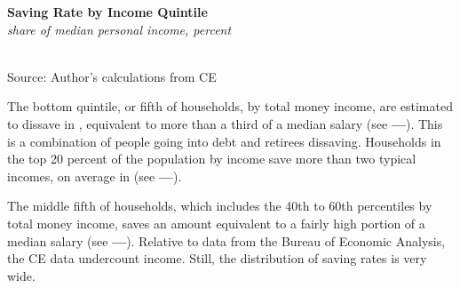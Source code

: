 \documentclass{report}
\makeatletter
\newcommand{\tbllink}[1]{\href{https://raw.githubusercontent.com/bdecon/US-chartbook/master/chartbook/data/#1}{\faTable}}
\newcommand*\short[1]{\expandafter\@gobbletwo\number\numexpr#1\relax}
\newcommand{\stdnode}[3]{\node[below, align=left, shift=({#1,#2})]{#3};}
\newcommand{\shdateaxisticks}{
		date coordinates in=x, axis line style={draw=none},
		xmax={2022-03-15},
		max space between ticks=40,	    
		xtick={{1990-01-01}, {1995-01-01}, {2000-01-01}, 
			{2005-01-01}, {2010-01-01}, {2015-01-01}, {2020-01-01}},
		minor xtick={},
		enlarge y limits={0.06}, enlarge x limits={0.01},
		}
\newcommand{\bbar}[2]{extra #1 ticks = {{#2}}, extra #1 tick labels = ,
		extra #1 tick style = {grid=major, grid style={thick, black!25}},}
\newcommand{\stdline}[4]{\addplot[very thick, no markers, color=#1] 
		table [x=#2, y=#3, col sep=comma] {#4};	}
\newcommand{\rbars}{
		\fill[color=black!10] (axis cs:{1990-07-01},\pgfkeysvalueof{/pgfplots/ymin}) rectangle 
			(axis cs:{1991-03-01}, \pgfkeysvalueof{/pgfplots/ymax});
		\fill[color=black!10] (axis cs:{2007-12-01},\pgfkeysvalueof{/pgfplots/ymin}) rectangle 
			(axis cs:{2009-07-01}, \pgfkeysvalueof{/pgfplots/ymax});
		\fill[color=black!10] (axis cs:{2001-03-01},\pgfkeysvalueof{/pgfplots/ymin}) rectangle 
			(axis cs:{2001-11-01}, \pgfkeysvalueof{/pgfplots/ymax});
		\fill[color=black!10] (axis cs:{2020-02-01},\pgfkeysvalueof{/pgfplots/ymin}) rectangle 
			(axis cs:{2020-05-01}, \pgfkeysvalueof{/pgfplots/ymax});}
\makeatother
\begin{document}
{\begin{minipage}{0.4\textwidth}
\normalsize \textbf{Saving Rate by Income Quintile}\\
\footnotesize{\textit{share of median personal income, percent}}\\
\hspace*{-2mm} \\
\footnotesize{Source: Author's calculations from CE} \hfill \tbllink{save_dist.csv} 
\end{minipage}\hspace{5.0mm}
\begin{minipage}{0.325\textwidth}
\small The bottom quintile, or fifth of households, by total money income, are estimated to dissave in \unskip, equivalent to more than a third of a median salary (see {\color{violet}\textbf{---}}). This is a combination of people going into debt and retirees dissaving. Households in the top 20 percent of the population by income save more than two typical incomes, on average in  (see {\color{blue!80!cyan!80!black}\textbf{---}}). 

The middle fifth of households, which includes the 40th to 60th percentiles by total money income, saves an amount equivalent to a fairly high portion of a median salary (see {\color{green!80!blue!85!black}\textbf{---}}). Relative to data from the Bureau of Economic Analysis, the CE data undercount income. Still, the distribution of saving rates is very wide.
\end{minipage}
\newpage
\begin{minipage}{0.76\textwidth}

\end{minipage}}
\end{document}
